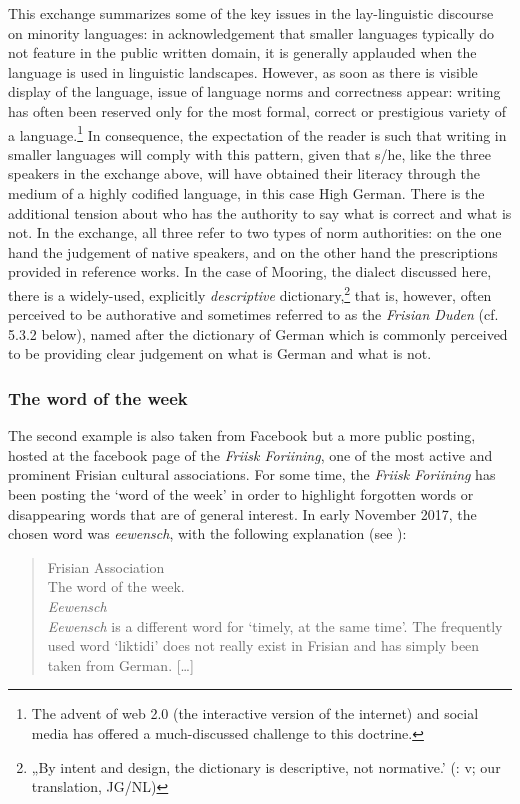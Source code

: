 \documentclass[output=paper]{langsci/langscibook}
\begin{document}
This exchange summarizes some of the key issues in the lay-linguistic discourse on minority languages: in acknowledgement that smaller languages typically do not feature in the public written domain, it is generally applauded when the language is used in linguistic landscapes. However, as soon as there is visible display of the language, issue of language norms and correctness appear: writing has often been reserved only for the most formal, correct or prestigious variety of a language.\footnote{The advent of web 2.0 (the interactive version of the internet) and social media has offered a much-discussed challenge to this doctrine.} In consequence, the expectation of the reader is such that writing in smaller languages will comply with this pattern, given that s/he, like the three speakers in the exchange above, will have obtained their literacy through the medium of a highly codified language, in this case High German. There is the additional tension about who has the authority to say what is correct and what is not. In the exchange, all three refer to two types of norm authorities: on the one hand the judgement of native speakers, and on the other hand the prescriptions provided in reference works. In the case of Mooring, the dialect discussed here, there is a widely-used, explicitly \textit{descriptive} dictionary,\footnote{„By intent and design, the dictionary is descriptive, not normative.’ (\citealt{SjolinEtAl1988}: v; our translation, JG/NL)} that is, however, often perceived to be authorative and sometimes referred to as the \textit{Frisian Duden} (cf. 5.3.2 below), named after the dictionary of German which is commonly perceived to be providing clear judgement on what is German and what is not. 


\subsubsection{The word of the week}
\label{sec:gregersen:5.3.2}

The second example is also taken from Facebook but a more public posting, hosted at the facebook page of the \textit{Friisk Foriining}, one of the most active and prominent Frisian cultural associations. For some time, the \textit{Friisk Foriining} has been posting the ‘word of the week’ in order to highlight forgotten words or disappearing words that are of general interest. In early November 2017, the chosen word was \textit{eewensch}, with the following explanation (see ):

\begin{quote}
Frisian Association\smallskip\\\relax
The word of the week.\smallskip\\\relax
\textit{Eewensch}\smallskip\\\relax
\textit{Eewensch} is a different word for ‘timely, at the same time’. The frequently used word ‘liktidi’ does not really exist in Frisian and has simply been taken from German. […]
\end{quote}
\end{document}
